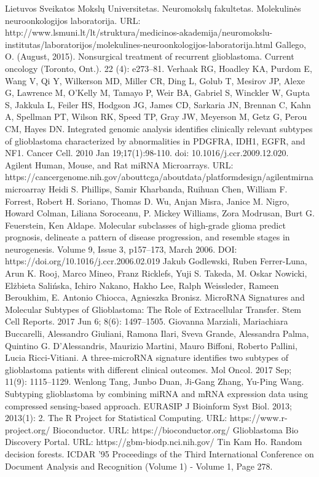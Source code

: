 \documentclass[a4paper,12pt]{article}
\begin{document}
\newpage
\begin{thebibliography}{2}
Lietuvos Sveikatos Mokslų Universitetas.
Neuromokslų fakultetas.
Molekulinės neuroonkologijos laboratorija.
URL: http://www.lsmuni.lt/lt/struktura/medicinos-akademija/neuromokslu-institutas/laboratorijos/molekulines-neuroonkologijos-laboratorija.html
Gallego, O. (August, 2015).
Nonsurgical treatment of recurrent glioblastoma.
Current oncology (Toronto, Ont.). 22 (4): e273–81.
Verhaak RG, Hoadley KA, Purdom E, Wang V, Qi Y, Wilkerson MD, Miller CR, Ding L, Golub T, Mesirov JP, Alexe G, Lawrence M, O'Kelly M, Tamayo P, Weir BA, Gabriel S, Winckler W, Gupta S, Jakkula L, Feiler HS, Hodgson JG, James CD, Sarkaria JN, Brennan C, Kahn A, Spellman PT, Wilson RK, Speed TP, Gray JW, Meyerson M, Getz G, Perou CM, Hayes DN.
Integrated genomic analysis identifies clinically relevant subtypes of glioblastoma characterized by abnormalities in PDGFRA, IDH1, EGFR, and NF1.
Cancer Cell. 2010 Jan 19;17(1):98-110. doi: 10.1016/j.ccr.2009.12.020.
Agilent Human, Mouse, and Rat miRNA Microarrays.
URL: https://cancergenome.nih.gov/abouttcga/aboutdata/platformdesign/agilentmirnamicroarray
Heidi S. Phillips, Samir Kharbanda, Ruihuan Chen, William F. Forrest, Robert H. Soriano, Thomas D. Wu, Anjan Misra, Janice M. Nigro, Howard Colman, Liliana Soroceanu, P. Mickey Williams, Zora Modrusan, Burt G. Feuerstein, Ken Aldape.
Molecular subclasses of high-grade glioma predict prognosis, delineate a pattern of disease progression, and resemble stages in neurogenesis.
Volume 9, Issue 3, p157–173, March 2006.
DOI: https://doi.org/10.1016/j.ccr.2006.02.019
Jakub Godlewski, Ruben Ferrer-Luna, Arun K. Rooj, Marco Mineo, Franz Ricklefs, Yuji S. Takeda, M. Oskar Nowicki, Elżbieta Salińska, Ichiro Nakano, Hakho Lee, Ralph Weissleder, Rameen Beroukhim, E. Antonio Chiocca, Agnieszka Bronisz.
MicroRNA Signatures and Molecular Subtypes of Glioblastoma: The Role of Extracellular Transfer.
Stem Cell Reports. 2017 Jun 6; 8(6): 1497–1505.
Giovanna Marziali, Mariachiara Buccarelli, Alessandro Giuliani, Ramona Ilari, Sveva Grande, Alessandra Palma, Quintino G. D'Alessandris, Maurizio Martini, Mauro Biffoni, Roberto Pallini, Lucia Ricci‐Vitiani.
A three‐microRNA signature identifies two subtypes of glioblastoma patients with different clinical outcomes.
Mol Oncol. 2017 Sep; 11(9): 1115–1129.
Wenlong Tang, Junbo Duan, Ji-Gang Zhang, Yu-Ping Wang.
Subtyping glioblastoma by combining miRNA and mRNA expression data using compressed sensing-based approach.
EURASIP J Bioinform Syst Biol. 2013; 2013(1): 2.
The R Project for Statistical Computing.
URL: https://www.r-project.org/
Bioconductor.
URL: https://bioconductor.org/
Glioblastoma Bio Discovery Portal.
URL: https://gbm-biodp.nci.nih.gov/
Tin Kam Ho.
Random decision forests.
ICDAR '95 Proceedings of the Third International Conference on Document Analysis and Recognition (Volume 1) - Volume 1, Page 278. 
\end{thebibliography}
\end{document}
